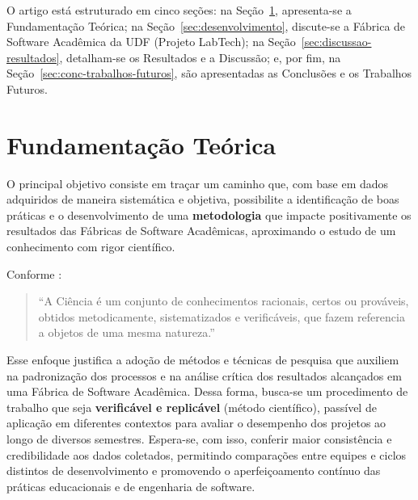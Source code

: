 \documentclass[
	12pt,           %
	openright,      %
	oneside,        %
	a4paper,        %
	brazil          %
]{abntex2}
\begin{document}
O artigo está estruturado em cinco seções: na Seção~\ref{cap:fundamentacao-teorica}, apresenta-se a Fundamentação Teórica; na Seção~\ref{sec:desenvolvimento}, discute-se a Fábrica de Software Acadêmica da UDF (Projeto LabTech); na Seção~\ref{sec:discussao-resultados}, detalham-se os Resultados e a Discussão; e, por fim, na Seção~\ref{sec:conc-trabalhos-futuros}, são apresentadas as Conclusões e os Trabalhos Futuros.

\chapter{Fundamenta{\c{c}}{\~a}o Te{\'o}rica}
\label{cap:fundamentacao-teorica}

O principal objetivo consiste em traçar um caminho que, com base em dados adquiridos de maneira sistemática e objetiva, possibilite a identificação de boas práticas e o desenvolvimento de uma \textbf{metodologia} que impacte positivamente os resultados das Fábricas de Software Acadêmicas, aproximando o estudo de um conhecimento com rigor científico.

Conforme :
\begin{quote}
    ``A Ci\^encia \'e um conjunto de conhecimentos racionais, certos ou prov\'aveis, obtidos metodicamente, sistematizados e verific\'aveis, que fazem referencia a objetos de uma mesma natureza.''
\end{quote}

Esse enfoque justifica a adoção de métodos e técnicas de pesquisa que auxiliem na padronização dos processos e na análise crítica dos resultados alcançados em uma Fábrica de Software Acadêmica. Dessa forma, busca-se um procedimento de trabalho que seja \textbf{verificável e replicável} (método científico), passível de aplicação em diferentes contextos para avaliar o desempenho dos projetos ao longo de diversos semestres. Espera-se, com isso, conferir maior consistência e credibilidade aos dados coletados, permitindo comparações entre equipes e ciclos distintos de desenvolvimento e promovendo o aperfeiçoamento contínuo das práticas educacionais e de engenharia de software.
\end{document}
